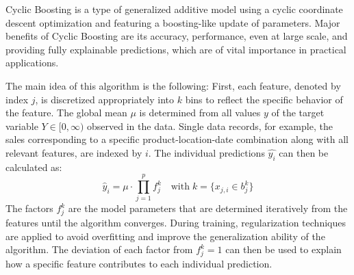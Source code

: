 \documentclass[BCOR=1mm, DIV=calc,10pt,
twoside=true,
twocolumn,
headings=normal]{scrartcl}
\begin{document}
Cyclic Boosting \cite{Wick2019} is a type of generalized additive model using a cyclic coordinate descent optimization and featuring a boosting-like update of parameters. Major benefits of Cyclic Boosting are its accuracy, performance, even at large scale, and providing fully explainable predictions, which are of vital importance in practical applications.

The main idea of this algorithm is the following: First, each feature, denoted by index $j$, is discretized appropriately into $k$ bins to reflect the specific behavior of the feature. The global mean $\mu$ is determined from all values $y$ of the  target variable $Y \in [0,\infty)$ observed in the data. Single data records, for example, the sales corresponding to a specific product-location-date combination along with all relevant features, are indexed by $i$.
The individual predictions $\hat{y_i}$  can then be calculated as:
\begin{equation} \label{eqn:cb}
\hat{y}_i = \mu \cdot \prod \limits_{j=1}^p f^k_j \quad \text{with}\; k=\{ x_{j,i} \in b^k_j\}
\end{equation}
The factors $f^k_j$ are the model parameters that are determined iteratively from the features until the algorithm converges. During training, regularization techniques are applied to avoid overfitting and improve the generalization ability of the algorithm. The deviation of each factor from $f^k_j=1$ can then be used to explain how a specific feature contributes to each individual prediction.
\end{document}
